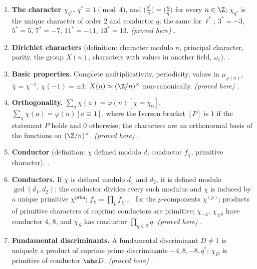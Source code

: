 \begin{enumerate}[label=\textbf{\thechapter.\arabic*}]
$\gcd(D,n)>1$, and is a real Dirichlet character modulo $\abs D$ with value $\sgn D$ at $-1$; values at primes;
$\bigl(\frac{DD'}\cdot\bigr)=\bigl(\frac D\cdot\bigr)\bigl(\frac{D'}\cdot\bigr)$ for discriminants $D,D'$, and $\bigl(\frac{Df^2}n\bigr)=\bigl(\frac Dn\bigr)$ for $\gcd(n,f)=1$.
\emph{(proved here)} .
\item \textbf{The character $\chi_{q^*}$.} $q^*\equiv1\pmod4$, and $\bigl(\frac{q^*}n\bigr)=\bigl(\frac nq\bigr)$ for every $n\in\Z$; $\chi_{q^*}$ is the unique
character of order $2$ and conductor $q$; the same for $\ell^*$; $3^*=-3$, $5^*=5$, $7^*=-7$, $11^*=-11$, $13^*=13$. \emph{(proved here)}
.
\item \textbf{Dirichlet characters} (definition: character modulo $n$, principal character, parity, the group $X(n)$,
characters with values in another field, $\omega_\ell$). .
\item \textbf{Basic properties.} Complete multiplicativity, periodicity, values in $\mu_{\varphi(n)}$, $\bar\chi=\chi^{-1}$, $\chi(-1)=\pm1$;
$X(n)\simeq(\Z/n)^\times$ non-canonically. \emph{(proved here)} .
\item \textbf{Orthogonality.} $\sum_a\chi(a)=\varphi(n)[\chi=\chi_0]$, $\sum_\chi\chi(a)=\varphi(n)[a\equiv1]$, where the Iverson bracket $[P]$ is $1$ if the statement $P$ holds and $0$ otherwise; the characters are an orthonormal basis
of the functions on $(\Z/n)^\times$. \emph{(proved here)} .
\item \textbf{Conductor} (definition: $\chi$ defined modulo $d$, conductor $f_\chi$, primitive character). .
\item \textbf{Conductors.} If $\chi$ is defined modulo $d_1$ and $d_2$, it is defined modulo $\gcd(d_1,d_2)$; the conductor divides every
such modulus and $\chi$ is induced by a unique primitive $\chi^{\mathrm{prim}}$; $f_\chi=\prod_pf_{\chi^{(p)}}$ for the $p$-components $\chi^{(p)}$; products of primitive characters
of coprime conductors are primitive; $\chi_{-4}$, $\chi_{\pm8}$ have conductor $4$, $8$, and $\chi_S$ has conductor $\prod_{q\in S}q$.
\emph{(proved here)} .
\item \textbf{Fundamental discriminants.} A fundamental discriminant $D\ne1$ is uniquely a product of coprime prime discriminants
$-4,8,-8,q^*$; $\chi_D$ is primitive of conductor $\abs D$. \emph{(proved here)} .

\end{enumerate}
